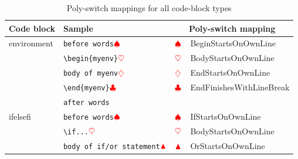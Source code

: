	\begin{longtable}{llll}
		\caption{Poly-switch mappings for all code-block types}\label{tab:poly-switch-mapping}                                                                                                                         \\
		\toprule
		Code block                             & Sample                                                  & \multicolumn{2}{c}{Poly-switch mapping}                                                                     \\
		\midrule
		environment                            & \verb!before words!$\color{red}\spadesuit$       & $\color{red}\spadesuit$                 & BeginStartsOnOwnLine                                              \\
		                                       & \verb!\begin{myenv}!$\color{red}\heartsuit$        & $\color{red}\heartsuit$                  & BodyStartsOnOwnLine                                               \\
		                                       & \verb!body of myenv!$\color{red}\diamondsuit$         & $\color{red}\diamondsuit$                   & EndStartsOnOwnLine                                                \\
		                                       & \verb!\end{myenv}!$\color{red}\clubsuit$   & $\color{red}\clubsuit$             & EndFinishesWithLineBreak                                          \\
		                                       & \verb!after words!                              &                                         &                                                                   \\
		\cmidrule{2-4}
		ifelsefi                               & \verb!before words!$\color{red}\spadesuit$       & $\color{red}\spadesuit$                 & IfStartsOnOwnLine                                                 \\
		                                       & \verb!\if...!$\color{red}\heartsuit$        & $\color{red}\heartsuit$                  & BodyStartsOnOwnLine                                               \\
		                                       & \verb!body of if/or statement!$\color{red}\blacktriangle$          & $\color{red}\blacktriangle$                    & OrStartsOnOwnLine                                                 %

\end{longtable}
